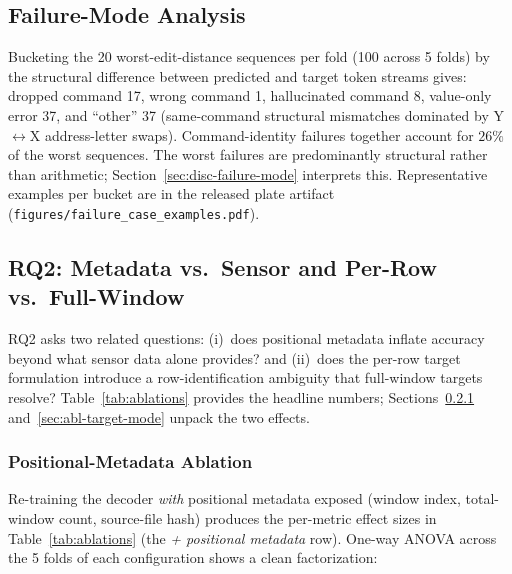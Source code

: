 \documentclass[sensors,article,submit,moreauthors,pdftex]{Definitions/mdpi}
\begin{document}
\subsection{Failure-Mode Analysis}
\label{sec:failure-modes}

Bucketing the 20 worst-edit-distance sequences per fold (100 across 5 folds) by the structural difference between predicted and target token streams gives: dropped command 17, wrong command 1, hallucinated command 8, value-only error 37, and ``other'' 37 (same-command structural mismatches dominated by Y$\leftrightarrow$X address-letter swaps). Command-identity failures together account for $26\%$ of the worst sequences. The worst failures are predominantly structural rather than arithmetic; Section~\ref{sec:disc-failure-mode} interprets this. Representative examples per bucket are in the released plate artifact (\texttt{figures/failure\_case\_examples.pdf}).

\subsection{RQ2: Metadata vs.\ Sensor and Per-Row vs.\ Full-Window}
\label{sec:results-rq2}

RQ2 asks two related questions: (i)~does positional metadata inflate accuracy beyond what sensor data alone provides? and (ii)~does the per-row target formulation introduce a row-identification ambiguity that full-window targets resolve? Table~\ref{tab:ablations} provides the headline numbers; Sections~\ref{sec:abl-positional} and~\ref{sec:abl-target-mode} unpack the two effects.



\subsubsection{Positional-Metadata Ablation}
\label{sec:abl-positional}
Re-training the decoder \emph{with} positional metadata exposed (window index, total-window count, source-file hash) produces the per-metric effect sizes in Table~\ref{tab:ablations} (the \emph{+ positional metadata} row). One-way ANOVA across the 5 folds of each configuration shows a clean factorization:
\end{document}
